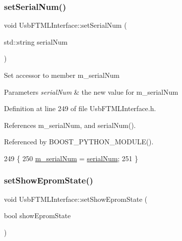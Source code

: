 \subsubsection{\texorpdfstring{set\+Serial\+Num()}{setSerialNum()}}
{\footnotesize\ttfamily void Usb\+F\+T\+M\+L\+Interface\+::set\+Serial\+Num (\begin{DoxyParamCaption}\item[{std\+::string}]{serial\+Num }\end{DoxyParamCaption})\hspace{0.3cm}{\ttfamily [inline]}}

Set accessor to member m\+\_\+serial\+Num 
\begin{DoxyParams}{Parameters}
{\em serial\+Num} & the new value for m\+\_\+serial\+Num \\
\hline
\end{DoxyParams}


Definition at line 249 of file Usb\+F\+T\+M\+L\+Interface.\+h.



References m\+\_\+serial\+Num, and serial\+Num().



Referenced by B\+O\+O\+S\+T\+\_\+\+P\+Y\+T\+H\+O\+N\+\_\+\+M\+O\+D\+U\+L\+E().


\begin{DoxyCode}
249                                           \{
250     \hyperlink{classUsbFTMLInterface_a389d847226de3203f7331ab8509c442c}{m\_serialNum} = \hyperlink{classUsbFTMLInterface_a6b005503472f0ff0357662555275cba4}{serialNum};
251   \}
\end{DoxyCode}
\mbox{\label{classUsbFTMLInterface_a051a6eb8e7fe43c9c97d61f8aafeea8e}} 
\subsubsection{\texorpdfstring{set\+Show\+Eprom\+State()}{setShowEpromState()}}
{\footnotesize\ttfamily void Usb\+F\+T\+M\+L\+Interface\+::set\+Show\+Eprom\+State (\begin{DoxyParamCaption}\item[{bool}]{show\+Eprom\+State }\end{DoxyParamCaption})\hspace{0.3cm}{\ttfamily [inline]}}

